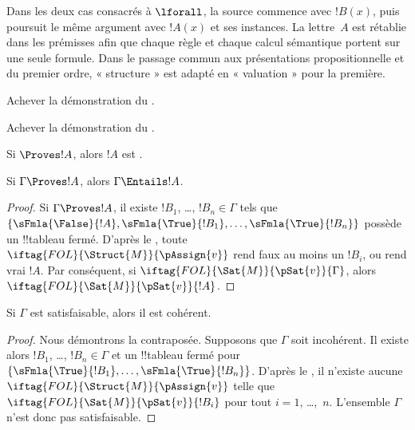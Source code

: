 \documentclass[11pt,a4paper,openany]{memoir}
\begin{document}
\begin{editorial}
Dans les deux cas consacrés à $\lforall$, la source commence avec
$!B(x)$, puis poursuit le même argument avec $!A(x)$ et ses instances.
La lettre~$A$ est rétablie dans les prémisses afin que chaque règle et
chaque calcul sémantique portent sur une seule formule. Dans le passage
commun aux présentations propositionnelle et du premier ordre,
« structure » est adapté en « valuation » pour la première.
\end{editorial}

\begin{prob}
Achever la démonstration du
.
\end{prob}
\tagendprob

\begin{prob}
Achever la démonstration du
.
\end{prob}
\tagendprob

\begin{cor}
Si $\Proves !A$, alors $!A$ est .
\end{cor}

\begin{cor}
Si $\Gamma \Proves !A$, alors $\Gamma \Entails !A$.
\end{cor}

\begin{proof}
  Si $\Gamma \Proves !A$, il existe $!B_1$, \dots, $!B_n \in
  \Gamma$ tels que $\{\sFmla{\False}{!A},
  \sFmla{\True}{!B_1}, \dots, \sFmla{\True}{!B_n}\}$ possède un
  !!{tableau} fermé. D'après le
  , toute
  ~$\iftag{FOL}{\Struct{M}}{\pAssign{v}}$
  rend faux au moins un $!B_i$, ou rend vrai $!A$. Par conséquent, si
  $\iftag{FOL}{\Sat{M}}{\pSat{v}}{\Gamma}$, alors
  $\iftag{FOL}{\Sat{M}}{\pSat{v}}{!A}$.
\end{proof}

\begin{cor}
Si $\Gamma$ est satisfaisable, alors il est cohérent.
\end{cor}

\begin{proof}
Nous démontrons la contraposée. Supposons que $\Gamma$ soit
incohérent. Il existe alors $!B_1$, \dots, $!B_n \in \Gamma$ et un
!!{tableau} fermé pour
$\{\sFmla{\True}{!B_1}, \dots, \sFmla{\True}{!B_n}\}$. D'après le
, il n'existe aucune
$\iftag{FOL}{\Struct{M}}{\pAssign{v}}$ telle que
$\iftag{FOL}{\Sat{M}}{\pSat{v}}{!B_i}$ pour tout
$i=1$, \dots,~$n$. L'ensemble $\Gamma$ n'est donc pas satisfaisable.
\end{proof}
\end{document}
